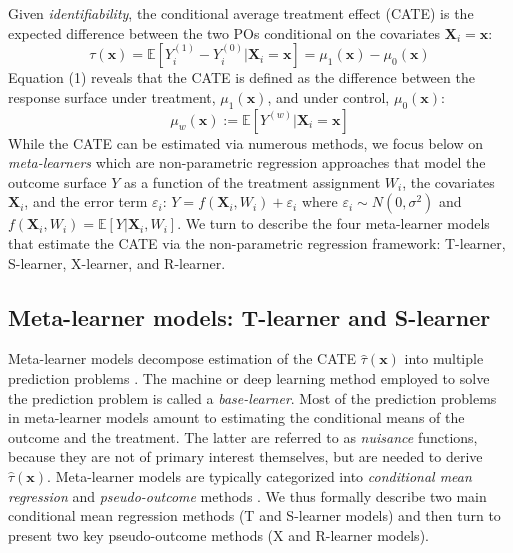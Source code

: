Given \emph{identifiability}, the conditional average treatment effect (CATE)
is the expected difference between the two POs conditional on the
covariates \(\mathbf{X}_{i}=\mathbf{x}\): \begin{equation}
\tau\left(\mathbf{x}\right)=\mathbb{E}\left[Y_{i}^{\left(1\right)}-Y_{i}^{\left(0\right)}|{\mathbf{X}_{i}}=\mathbf{x}\right]=\mu_{1}\left(\mathbf{x}\right)-\mu_{0}\left(\mathbf{x}\right)
\end{equation} Equation (1) reveals that the CATE is defined as the
difference between the response surface under treatment,
\(\mu_{1}\left(\mathbf{x}\right)\), and under control,
\(\mu_{0}\left(\mathbf{x}\right)\): \begin{equation}
\mu_{w}\left(\mathbf{x}\right):=\mathbb{E}\left[Y^{(w)}|\mathbf{X}_{i}=\mathbf{x}\right]
\end{equation} While the CATE can be estimated via numerous methods, we
focus below on \emph{meta-learners} which are non-parametric regression
approaches that model the outcome surface \(Y\) as a function of the
treatment assignment \(W_{i}\), the covariates \(\mathbf{X}_{i}\), and the
error term \(\varepsilon_{i}\):
\(Y=f\left(\mathbf{X}_{i}, W_{i}\right)+\varepsilon_{i}\) where
\(\varepsilon_{i}\sim N\left(0,\sigma^{2}\right)\) and
\(f\left(\mathbf{X}_{i}, W_{i}\right)=\mathbb{E}\left[Y|\mathbf{X}_{i},W_{i}\right]\).
We turn to describe the four meta-learner models that estimate the CATE
via the non-parametric regression framework: T-learner, S-learner,
X-learner, and R-learner.

\subsection{Meta-learner models: T-learner and S-learner}\label{meta-learner-models-t-learner-and-s-learner}

Meta-learner models decompose estimation of the CATE
\(\hat{\tau}\left(\mathbf{x}\right)\) into multiple prediction problems
\citep{Kunzel2019meta}. The machine or deep learning method employed to solve
the prediction problem is called a \emph{base-learner}. Most of the
prediction problems in meta-learner models amount to estimating the
conditional means of the outcome and the treatment. The latter are
referred to as \emph{nuisance} functions, because they are not of primary
interest themselves, but are needed to derive
\(\hat{\tau}\left(\mathbf{x}\right)\). Meta-learner models are typically
categorized into \emph{conditional mean regression} and \emph{pseudo-outcome}
methods \citep{Okasa2022metalearners}. We thus formally describe two main
conditional mean regression methods (T and S-learner models) and then
turn to present two key pseudo-outcome methods (X and R-learner models).


